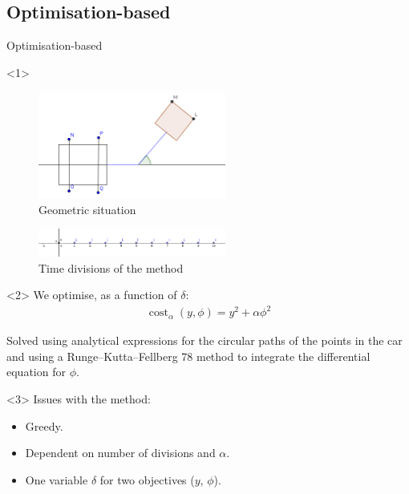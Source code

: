 \subsection{Optimisation-based}

\begin{frame}{Optimisation-based}

\begin{onlyenv}<1>
\begin{figure}[H]
    \centering
    \includegraphics[width=0.55\textwidth]{images/pic_trailer.png}
    \caption{Geometric situation}
    \label{fig:trailer}
\end{figure}

\begin{figure}[H]
    \centering
    \includegraphics[width=0.55\textwidth]{images/divisions.png}
    \caption{Time divisions of the method}
    \label{fig:trailer2}
\end{figure}
\end{onlyenv}

\begin{onlyenv}<2>
We optimise, as a function of $\delta$:
\begin{align}
    \operatorname{cost}_{\alpha}(y, \phi) = y^2+\alpha \phi^2 
\end{align}

Solved using analytical expressions for the circular paths of the points in the car and using a Runge--Kutta--Fellberg 78 method to integrate the differential equation for $\phi$.
\end{onlyenv}

\begin{onlyenv}<3>
Issues with the method:
\begin{itemize}
    \item Greedy.
    \item Dependent on number of divisions and $\alpha$.
    \item One variable $\delta$ for two objectives ($y$, $\phi$).
\end{itemize}

\end{onlyenv}



\end{frame}


